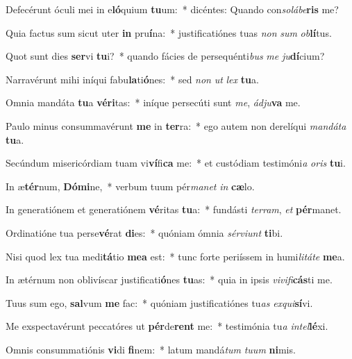 \item Defecérunt óculi mei in e\textbf{ló}quium \textbf{tu}um:~* dicéntes: Quando con\textit{so}\textit{lá}\textit{be}\textbf{ris} me?
\item Quia factus sum sicut uter \textbf{in} pru\textbf{í}na:~* justificatiónes tuas \textit{non} \textit{sum} \textit{ob}\textbf{lí}tus.
\item Quot sunt dies \textbf{ser}vi \textbf{tu}i?~* quando fácies de persequénti\textit{bus} \textit{me} \textit{ju}\textbf{dí}cium?
\item Narravérunt mihi iníqui fabu\textbf{la}ti\textbf{ó}nes:~* sed \textit{non} \textit{ut} \textit{lex} \textbf{tu}a.
\item Omnia mandáta \textbf{tu}a \textbf{vé}\textbf{ri}tas:~* iníque persecúti sunt \textit{me}, \textit{ád}\textit{ju}\textbf{va} me.
\item Paulo minus consummavérunt \textbf{me} in \textbf{ter}ra:~* ego autem non derelíqui \textit{man}\textit{dá}\textit{ta} \textbf{tu}a.
\item Secúndum misericórdiam tuam vi\textbf{ví}fi\textbf{ca} me:~* et custódiam testimóni\textit{a} \textit{o}\textit{ris} \textbf{tu}i.
\item In æ\textbf{tér}num, \textbf{Dó}\textbf{mi}ne,~* verbum tuum pér\textit{ma}\textit{net} \textit{in} \textbf{cæ}lo.
\item In generatiónem et generatiónem \textbf{vé}ritas \textbf{tu}a:~* fundásti \textit{ter}\textit{ram}, \textit{et} \textbf{pér}manet.
\item Ordinatióne tua perse\textbf{vé}rat \textbf{di}es:~* quóniam ómnia \textit{sér}\textit{vi}\textit{unt} \textbf{ti}bi.
\item Nisi quod lex tua medi\textbf{tá}tio \textbf{me}\textbf{a} est:~* tunc forte periíssem in humi\textit{li}\textit{tá}\textit{te} \textbf{me}a.
\item In ætérnum non oblivíscar justificati\textbf{ó}nes \textbf{tu}as:~* quia in ipsis \textit{vi}\textit{vi}\textit{fi}\textbf{cás}ti me.
\item Tuus sum ego, \textbf{sal}vum \textbf{me} fac:~* quóniam justificatiónes tu\textit{as} \textit{ex}\textit{qui}\textbf{sí}vi.
\item Me exspectavérunt peccatóres ut \textbf{pér}de\textbf{rent} me:~* testimónia tu\textit{a} \textit{in}\textit{tel}\textbf{lé}xi.
\item Omnis consummatiónis \textbf{vi}di \textbf{fi}nem:~* latum mandá\textit{tum} \textit{tu}\textit{um} \textbf{ni}mis.
